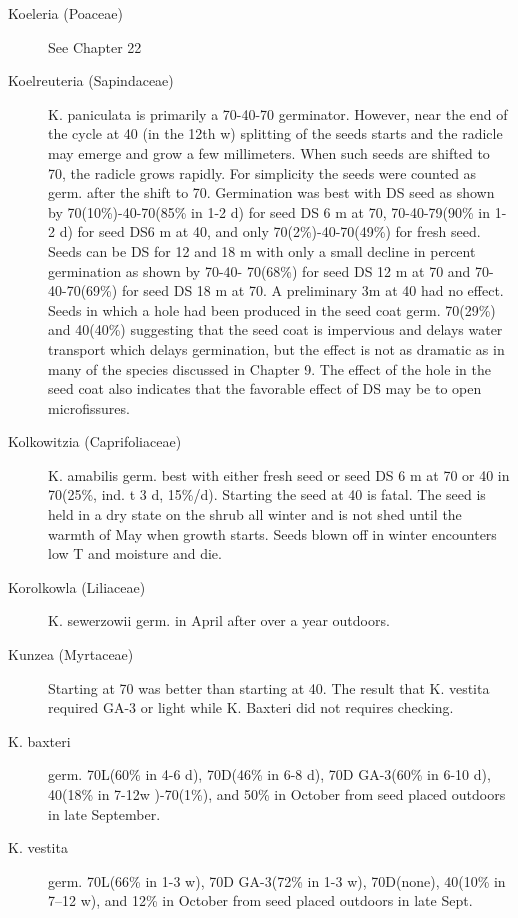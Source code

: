 \begin{description}
\item[Koeleria (Poaceae)] See Chapter 22
\item[Koelreuteria (Sapindaceae)] K. paniculata is primarily a 70-40-70
germinator. However, near the end of the cycle at 40 (in the 12th w) splitting of the
seeds starts and the radicle may emerge and grow a few millimeters. When such
seeds are shifted to 70, the radicle grows rapidly. For simplicity the seeds were
counted as germ. after the shift to 70. Germination was best with DS seed as shown
by 70(10\%)-40-70(85\% in 1-2 d) for seed DS 6 m at 70, 70-40-79(90\% in 1-2 d) for
seed DS6 m at 40, and only 70(2\%)-40-70(49\%) for fresh seed. Seeds can be DS for
12 and 18 m with only a small decline in percent germination as shown by 70-40-
70(68\%) for seed DS 12 m at 70 and 70-40-70(69\%) for seed DS 18 m at 70. A
preliminary 3m at 40 had no effect. Seeds in which a hole had been produced in the
seed coat germ. 70(29\%) and 40(40\%) suggesting that the seed coat is impervious
and delays water transport which delays germination, but the effect is not as dramatic
as in many of the species discussed in Chapter 9. The effect of the hole in the seed
coat also indicates that the favorable effect of DS may be to open microfissures.
\item[Kolkowitzia (Caprifoliaceae)] K. amabilis germ. best with either fresh seed
or seed DS 6 m at 70 or 40 in 70(25\%, ind. t 3 d, 15\%/d). Starting the seed at 40 is
fatal. The seed is held in a dry state on the shrub all winter and is not shed until the
warmth of May when growth starts. Seeds blown off in winter encounters low T and
moisture and die.
\item[Korolkowla (Liliaceae)] K. sewerzowii germ. in April after over a year
outdoors.
\item[Kunzea (Myrtaceae)] Starting at 70 was better than starting at 40. The
result that K. vestita required GA-3 or light while K. Baxteri did not requires checking.
\item[K. baxteri] germ. 70L(60\% in 4-6 d), 70D(46\% in 6-8 d), 70D GA-3(60\% in 6-10
d), 40(18\% in 7-12w )-70(1\%), and 50\% in October from seed placed outdoors in late
September.
\item[K. vestita] germ. 70L(66\% in 1-3 w), 70D GA-3(72\% in 1-3 w), 70D(none),
40(10\% in 7--12 w), and 12\% in October from seed placed outdoors in late Sept.

\end{description}
